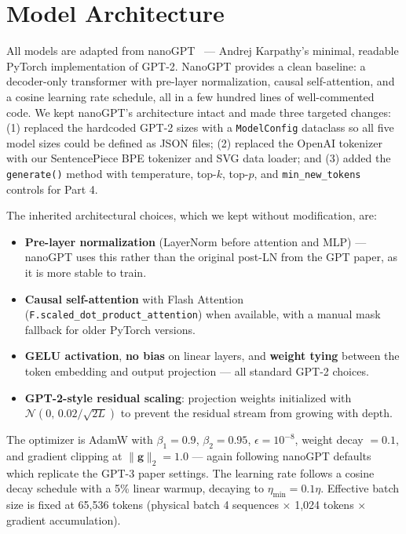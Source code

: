 \documentclass[10pt,letterpaper]{article}
\begin{document}
\section{Model Architecture}
\label{sec:arch}

All models are adapted from nanoGPT~\cite{karpathy2022nanogpt} — Andrej
Karpathy's minimal, readable PyTorch implementation of GPT-2. NanoGPT
provides a clean baseline: a decoder-only transformer with pre-layer
normalization, causal self-attention, and a cosine learning rate schedule,
all in a few hundred lines of well-commented code. We kept nanoGPT's
architecture intact and made three targeted changes: (1) replaced the
hardcoded GPT-2 sizes with a \texttt{ModelConfig} dataclass so all five
model sizes could be defined as JSON files; (2) replaced the OpenAI
tokenizer with our SentencePiece BPE tokenizer and SVG data loader; and
(3) added the \texttt{generate()} method with temperature, top-$k$,
top-$p$, and \texttt{min\_new\_tokens} controls for Part 4.

The inherited architectural choices, which we kept without modification, are:
\begin{itemize}[leftmargin=*, nosep]
  \item \textbf{Pre-layer normalization} (LayerNorm before attention and
    MLP) — nanoGPT uses this rather than the original post-LN from the GPT
    paper, as it is more stable to train.
  \item \textbf{Causal self-attention} with Flash Attention
    (\texttt{F.scaled\_dot\_product\_attention}) when available, with a
    manual mask fallback for older PyTorch versions.
  \item \textbf{GELU activation}, \textbf{no bias} on linear layers,
    and \textbf{weight tying} between the token embedding and output
    projection — all standard GPT-2 choices.
  \item \textbf{GPT-2-style residual scaling}: projection weights
    initialized with $\mathcal{N}(0,\, 0.02/\sqrt{2L})$ to prevent the
    residual stream from growing with depth.
\end{itemize}

The optimizer is AdamW with $\beta_1 = 0.9$, $\beta_2 = 0.95$,
$\epsilon = 10^{-8}$, weight decay $= 0.1$, and gradient clipping at
$\|\mathbf{g}\|_2 = 1.0$ — again following nanoGPT defaults which
replicate the GPT-3 paper settings. The learning rate follows a cosine
decay schedule with a 5\% linear warmup, decaying to
$\eta_\text{min} = 0.1\eta$. Effective batch size is fixed at 65,536
tokens (physical batch 4 sequences $\times$ 1,024 tokens $\times$
gradient accumulation).
\end{document}
